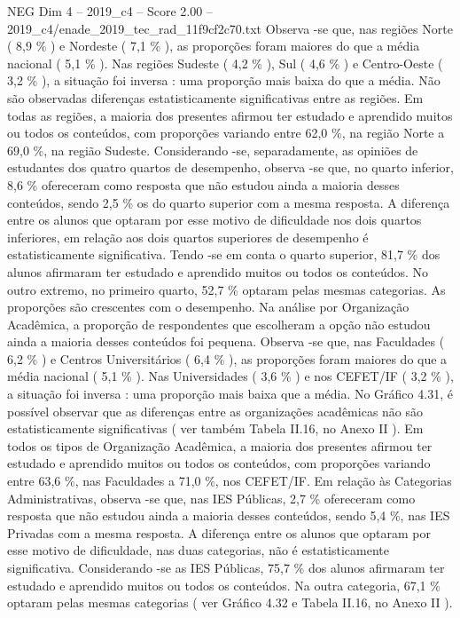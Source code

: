 \begin{textsample}{NEG Dim 4 – 2019\_c4 – Score 2.00 – 2019\_c4/enade\_2019\_tec\_rad\_11f9cf2c70.txt}
Observa -se que, nas regiões Norte ( 8,9 \% ) e Nordeste ( 7,1 \% ), as proporções foram maiores do que a média nacional ( 5,1 \% ).
Nas regiões Sudeste ( 4,2 \% ), Sul ( 4,6 \% ) e Centro-Oeste ( 3,2 \% ), a situação foi inversa : uma proporção mais baixa do que a média.
Não são observadas diferenças estatisticamente significativas entre as regiões.
Em todas as regiões, a maioria dos presentes afirmou ter estudado e aprendido muitos ou todos os conteúdos, com proporções variando entre 62,0 \%, na região Norte a 69,0 \%, na região Sudeste.
Considerando -se, separadamente, as opiniões de estudantes dos quatro quartos de desempenho, observa -se que, no quarto inferior, 8,6 \% ofereceram como resposta que não estudou ainda a maioria desses conteúdos, sendo 2,5 \% os do quarto superior com a mesma resposta.
A diferença entre os alunos que optaram por esse motivo de dificuldade nos dois quartos inferiores, em relação aos dois quartos superiores de desempenho é estatisticamente significativa.
Tendo -se em conta o quarto superior, 81,7 \% dos alunos afirmaram ter estudado e aprendido muitos ou todos os conteúdos.
No outro extremo, no primeiro quarto, 52,7 \% optaram pelas mesmas categorias.
As proporções são crescentes com o desempenho.
Na análise por Organização Acadêmica, a proporção de respondentes que escolheram a opção não estudou ainda a maioria desses conteúdos foi pequena.
Observa -se que, nas Faculdades ( 6,2 \% ) e Centros Universitários ( 6,4 \% ), as proporções foram maiores do que a média nacional ( 5,1 \% ).
Nas Universidades ( 3,6 \% ) e nos CEFET/IF ( 3,2 \% ), a situação foi inversa : uma proporção mais baixa que a média.
No Gráfico 4.31, é possível observar que as diferenças entre as organizações acadêmicas não são estatisticamente significativas ( ver também Tabela II.16, no Anexo II ).
Em todos os tipos de Organização Acadêmica, a maioria dos presentes afirmou ter estudado e aprendido muitos ou todos os conteúdos, com proporções variando entre 63,6 \%, nas Faculdades a 71,0 \%, nos CEFET/IF.
Em relação às Categorias Administrativas, observa -se que, nas IES Públicas, 2,7 \% ofereceram como resposta que não estudou ainda a maioria desses conteúdos, sendo 5,4 \%, nas IES Privadas com a mesma resposta.
A diferença entre os alunos que optaram por esse motivo de dificuldade, nas duas categorias, não é estatisticamente significativa.
Considerando -se as IES Públicas, 75,7 \% dos alunos afirmaram ter estudado e aprendido muitos ou todos os conteúdos.
Na outra categoria, 67,1 \% optaram pelas mesmas categorias ( ver Gráfico 4.32 e Tabela II.16, no Anexo II ).

\end{textsample}
